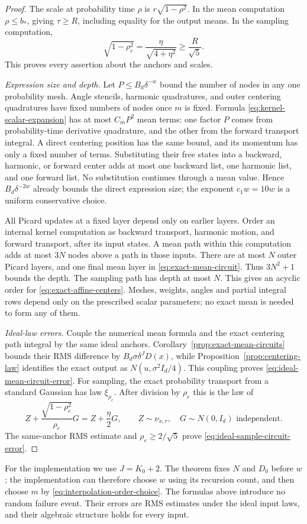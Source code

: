 \begin{proof}
The scale at probability time $\rho$ is
$r\sqrt{1-\rho^2}$.  In the mean computation $\rho\le b_*$, giving
$\tau\ge R$, including equality for the output means.  In the
sampling computation,
\[
 \sqrt{1-\rho_e^2}=\frac\eta{\sqrt{4+\eta^2}}
                 \ge\frac R{\sqrt5}.
\]
This proves every assertion about the anchors and scales.

\emph{Expression size and depth.}
Let $P\le B_d\delta^{-w}$ bound the number of nodes in any one
probability mesh.  Angle stencils, harmonic quadratures, and outer
centering quadratures have fixed numbers of nodes once $m$ is fixed.
Formula \eqref{eq:kernel-scalar-expansion} has at most $C_mP^2$
mean terms: one factor $P$ comes from probability-time derivative
quadrature, and the other from the forward transport integral.
A direct centering position has the same bound, and its momentum has
only a fixed number of terms.  Substituting their free states into a
backward, harmonic, or forward center adds at most one backward list,
one harmonic list, and one forward list.  No substitution continues
through a mean value.  Hence $B_d\delta^{-2w}$ already bounds the
direct expression size; the exponent $c_1w=10w$ is a uniform
conservative choice.

All Picard updates at a fixed layer depend only on earlier layers.
Order an internal kernel computation as backward transport, harmonic
motion, and forward transport, after its input states.  A mean path
within this computation adds at most $3N$ nodes above a path in those
inputs.  There are at most $N$ outer Picard layers, and one final
mean layer in \eqref{eq:exact-mean-circuit}.  Thus $3N^2+1$ bounds
the depth.  The sampling path has depth at most $N$.  This gives an
acyclic order for \eqref{eq:exact-affine-centers}.  Meshes, weights,
angles and partial integral rows depend only on the prescribed scalar
parameters; no exact mean is needed to form any of them.

\emph{Ideal-law errors.}
Couple the numerical mean formula and the exact centering path integral
by the same ideal anchors.  Corollary~\ref{prop:exact-mean-circuits}
bounds their RMS difference by $B_d\sigma\delta^JD(x)$, while
Proposition~\ref{prop:centering-law} identifies the exact output as
$N(u,\sigma^2I_d/4)$.  This coupling proves
\eqref{eq:ideal-mean-circuit-error}.  For sampling, the exact
probability transport from a standard Gaussian has law $\xi_{\rho_e}$.
After division by $\rho_e$ this is the law of
\[
 Z+\frac{\sqrt{1-\rho_e^2}}{\rho_e}G
       =Z+\frac\eta2G,
 \qquad Z\sim\nu_{x,r},\quad G\sim N(0,I_d)\text{ independent}.
\]
The same-anchor RMS estimate and $\rho_e\ge2/\sqrt5$ prove
\eqref{eq:ideal-sample-circuit-error}.
\end{proof}

For the implementation we use $J=K_0+2$.  The theorem fixes $N$ and
$D_0$ before $w$; the implementation can therefore choose $w$ using
its recursion count, and then choose $m$ by
\eqref{eq:interpolation-order-choice}.  The formulas above introduce
no random failure event.  Their errors are RMS estimates under the
ideal input laws, and their algebraic structure holds for every input.
